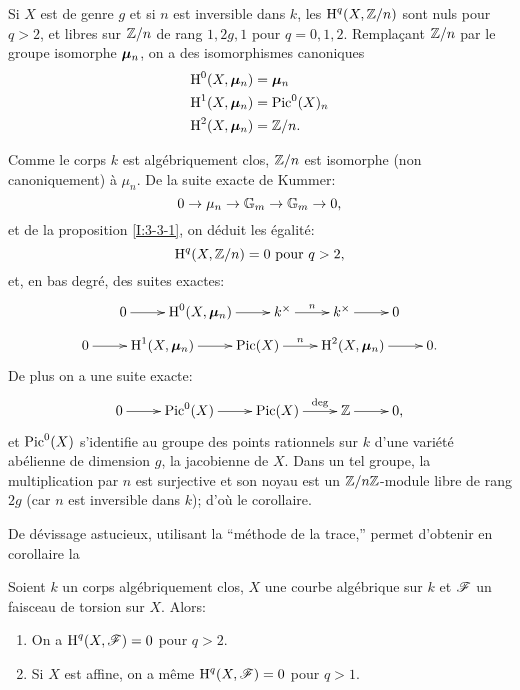 \documentclass[oneside]{book}
\begin{document}
\begin{corollary}\label{I:3-3-5}
Si $X$ est de genre $g$ et si $n$ est inversible dans $k$, les 
$\operatorname{H}^q(X,\mathbb{Z}/n)$ sont nuls pour $q>2$, et libres sur $\mathbb{Z}/n$ de rang $1,2 g,1$ 
pour $q=0,1,2$. Remplaçant $\mathbb{Z}/n$ par le groupe isomorphe ${\bm\mu}_n$, on a des 
isomorphismes canoniques 
\begin{align*}
  \operatorname{H}^0(X,{\bm\mu}_n) &= {\bm\mu}_n \\
  \operatorname{H}^1(X,{\bm\mu}_n) &= \operatorname{Pic}^0(X)_n \\
  \operatorname{H}^2(X,{\bm\mu}_n) &= \mathbb{Z}/n \text{.}
\end{align*}
\end{corollary}

Comme le corps $k$ est algébriquement clos, $\mathbb{Z}/n$ est isomorphe (non 
canoniquement) à $\mu_n$. De la suite exacte de Kummer:
\[
  0 \to \mu_n \to \mathbb{G}_m \to \mathbb{G}_m \to 0\text{,}
\]
et de la proposition \ref{I:3-3-1}, on déduit les égalité:
\[
  \operatorname{H}^q(X,\mathbb{Z}/n) = 0 \text{ pour $q>2$,}
\]
et, en bas degré, des suites exactes:
\[\xymatrix{
  0 \ar[r] 
    & \h^0(X,\dmu_n) \ar[r] 
    & k^\times \ar[r]^-n 
    & k^\times \ar[r] 
    & 0
}\]
\[\xymatrix{
  0 \ar[r] 
    & \h^1(X,\dmu_n) \ar[r] 
    & \pic(X) \ar[r]^-n 
    & \h^2(X,\dmu_n) \ar[r] 
    & 0\text{.}
}\]
De plus on a une suite exacte:
\[\xymatrix{
  0 \ar[r] 
    & \pic^0(X) \ar[r] 
    & \pic(X) \ar[r]^-{\deg}
    & \dZ \ar[r] 
    & 0 \text{,}
}\]
et $\operatorname{Pic}^0(X)$ s'identifie au groupe des points rationnels sur $k$ d'une 
variété abélienne de dimension $g$, la jacobienne de $X$. Dans un tel 
groupe, la multiplication par $n$ est surjective et son noyau est un 
$\mathbb{Z}/n\mathbb{Z}$-module libre de rang $2 g$ (car $n$ est inversible dans $k$); d'où 
le corollaire. 

De dévissage astucieux, utilisant la ``méthode de la trace,'' permet 
d'obtenir en corollaire la 





\begin{proposition}[{\cite[IX 5.7]{4}}]\label{I:3-3-6}
Soient $k$ un corps algébriquement clos, $X$ une courbe algébrique sur $k$ 
et $\mathscr{F}$ un faisceau de torsion sur $X$. Alors:
\begin{enumerate}[\indent i)]
  \item On a $\operatorname{H}^q(X,\mathscr{F}) = 0$ pour $q>2$.
  \item Si $X$ est affine, on a même $\operatorname{H}^q(X,\mathscr{F}) = 0$ pour $q>1$.
\end{enumerate}
\end{proposition}
\end{document}
